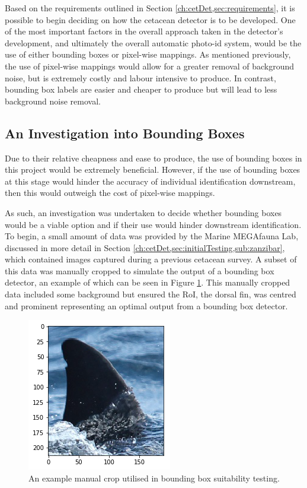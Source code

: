 Based on the requirements outlined in Section \ref{ch:cetDet,sec:requirements}, it is possible to begin deciding on how the cetacean detector is to be developed. One of the most important factors in the overall approach taken in the detector's development, and ultimately the overall automatic photo-id system, would be the use of either bounding boxes or pixel-wise mappings. As mentioned previously, the use of pixel-wise mappings would allow for a greater removal of background noise, but is extremely costly and labour intensive to produce. In contrast, bounding box labels are easier and cheaper to produce but will lead to less background noise removal. 

\subsection{An Investigation into Bounding Boxes}\label{ch:cetDet,sec:deciding,sub:boundingBoxInvestigation}

Due to their relative cheapness and ease to produce, the use of bounding boxes in this project would be extremely beneficial. However, if the use of bounding boxes at this stage would hinder the accuracy of individual identification downstream, then this would outweigh the cost of pixel-wise mappings. 

As such, an investigation was undertaken to decide whether bounding boxes would be a viable option and if their use would hinder downstream identification. To begin, a small amount of data was provided by the Marine MEGAfauna Lab, discussed in more detail in Section \ref{ch:cetDet,sec:initialTesting,sub:zanzibar}, which contained images captured during a previous cetacean survey. A subset of this data was manually cropped to simulate the output of a bounding box detector, an example of which can be seen in Figure \ref{fig:manual-crop-example}. This manually cropped data included some background but ensured the RoI, the dorsal fin, was centred and prominent representing an optimal output from a bounding box detector. 

\begin{figure}
	\begin{center}
		\includegraphics[scale=0.6]{Chapter3/figs/manual-crop-example.png}
	\end{center}
	\caption{An example manual crop utilised in bounding box suitability testing.
	}
	\label{fig:manual-crop-example}
\end{figure}

